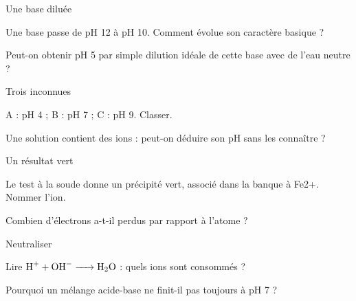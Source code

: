 \par\noindent\begin{minipage}{\linewidth}
\begin{exercice}[2]{Une base diluée}
\begin{questions}
\item Une base passe de pH 12 à pH 10. Comment évolue son caractère basique ?
\item Peut-on obtenir pH 5 par simple dilution idéale de cette base avec de l’eau neutre ?
\end{questions}
\end{exercice}
\end{minipage}
\par\noindent\begin{minipage}{\linewidth}
\begin{exercice}[2]{Trois inconnues}
\begin{questions}
\item A : pH 4 ; B : pH 7 ; C : pH 9. Classer.
\item Une solution contient des ions : peut-on déduire son pH sans les connaître ?
\end{questions}
\end{exercice}
\end{minipage}
\par\noindent\begin{minipage}{\linewidth}
\begin{exercice}[2]{Un résultat vert}
\begin{questions}
\item Le test à la soude donne un précipité vert, associé dans la banque à Fe2+. Nommer l’ion.
\item Combien d’électrons a-t-il perdus par rapport à l’atome ?
\end{questions}
\end{exercice}
\end{minipage}
\par\noindent\begin{minipage}{\linewidth}
\begin{exercice}[2]{Neutraliser}
\begin{questions}
\item Lire $\ce{H+ + OH- -> H2O}$ : quels ions sont consommés ?
\item Pourquoi un mélange acide-base ne finit-il pas toujours à pH 7 ?
\end{questions}
\end{exercice}
\end{minipage}
